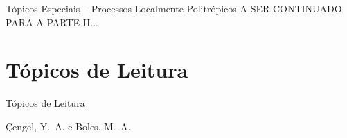     \begin{frame}{Tópicos Especiais -- Processos Localmente Politrópicos}\vspace*{-2em}
        A SER CONTINUADO PARA A PARTE-II...
    \end{frame}

\section{Tópicos de Leitura}

    \begin{frame}[allowframebreaks]{Tópicos de Leitura}
        \begin{thebibliography}{Çengel, Y.~A., 2013}
                Çengel, Y.~A. e Boles, M.~A.
        \end{thebibliography}
    \end{frame}




